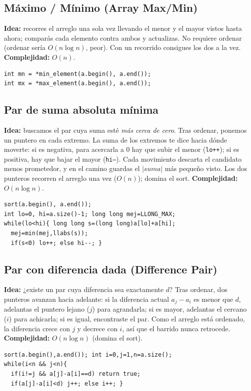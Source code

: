 \documentclass[10pt,a4paper,twocolumn]{article}
\begin{document}
\subsection{Máximo / Mínimo (Array Max/Min)}
\textbf{Idea:} recorres el arreglo una sola vez llevando el menor y el
mayor vistos hasta ahora; comparás cada elemento contra ambos y
actualizas. No requiere ordenar (ordenar sería $O(n\log n)$, peor). Con
un recorrido consigues los dos a la vez. \textbf{Complejidad:} $O(n)$.
\begin{lstlisting}[style=cpp]
int mn = *min_element(a.begin(), a.end());
int mx = *max_element(a.begin(), a.end());
\end{lstlisting}


\subsection{Par de suma absoluta mínima}
\textbf{Idea:} buscamos el par cuya suma esté \emph{más cerca de cero}.
Tras ordenar, ponemos un puntero en cada extremo. La suma de los
extremos te dice hacia dónde moverte: si es negativa, para acercarla a
$0$ hay que subir el menor (\texttt{lo++}); si es positiva, hay que
bajar el mayor (\texttt{hi--}). Cada movimiento descarta el candidato
menos prometedor, y en el camino guardas el $|suma|$ más pequeño visto.
Los dos punteros recorren el arreglo una vez ($O(n)$); domina el sort.
\textbf{Complejidad:} $O(n\log n)$.
\begin{lstlisting}[style=cpp]
sort(a.begin(), a.end());
int lo=0, hi=a.size()-1; long long mej=LLONG_MAX;
while(lo<hi){ long long s=(long long)a[lo]+a[hi];
  mej=min(mej,llabs(s));
  if(s<0) lo++; else hi--; }
\end{lstlisting}


\subsection{Par con diferencia dada (Difference Pair)}
\textbf{Idea:} ¿existe un par cuya diferencia sea exactamente $d$? Tras
ordenar, dos punteros avanzan hacia adelante: si la diferencia actual
$a_j-a_i$ es menor que $d$, adelantas el puntero lejano ($j$) para
agrandarla; si es mayor, adelantas el cercano ($i$) para achicarla; si
es igual, encontraste el par. Como el arreglo está ordenado, la
diferencia crece con $j$ y decrece con $i$, así que el barrido nunca
retrocede. \textbf{Complejidad:} $O(n\log n)$ (domina el sort).
\begin{lstlisting}[style=cpp]
sort(a.begin(),a.end()); int i=0,j=1,n=a.size();
while(i<n && j<n){
  if(i!=j && a[j]-a[i]==d) return true;
  if(a[j]-a[i]<d) j++; else i++; }
\end{lstlisting}
\end{document}
